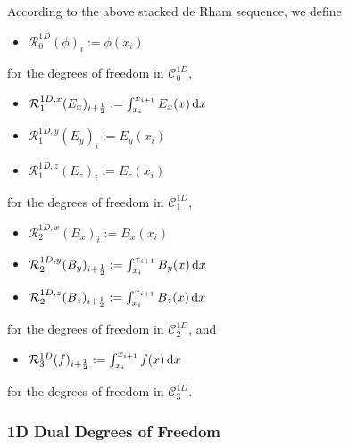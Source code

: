 \documentclass[11pt]{article}
\begin{document}
According to the above stacked de Rham sequence, we define
\begin{itemize}
    \item $\mathcal{R}^{1D}_0(\phi)_{i} := \phi(x_i)$
\end{itemize}
for the degrees of freedom in $\mathcal{C}_0^{1D}$,
\begin{itemize}
    \item $\mathcal{R}^{1D,x}_1(E_x)_{{i+\frac12}} := \int_{x_i}^{x_{i+1}} E_x(x)\, {\rm d} x $
    \item $\mathcal{R}^{1D,y}_1(E_y)_{i} := E_y(x_i) $
    \item $\mathcal{R}^{1D,z}_1(E_z)_{i} := E_z(x_i)$
\end{itemize}
for the degrees of freedom in $\mathcal{C}_1^{1D}$,
\begin{itemize}
    \item $\mathcal{R}^{1D,x}_2(B_x)_{i} := B_x(x_i)$
    \item $\mathcal{R}^{1D,y}_2(B_y)_{{i+\frac12}} := \int_{x_i}^{x_{i+1}} B_y(x)\, {\rm d} x $
    \item $\mathcal{R}^{1D,z}_2(B_z)_{{i+\frac12}} := \int_{x_i}^{x_{i+1}} B_z(x)\, {\rm d} x $
\end{itemize}
for the degrees of freedom in $\mathcal{C}_2^{1D}$,
and 
\begin{itemize}
    \item $\mathcal{R}^{1D}_3(f)_{{i+\frac12}} := \int_{x_i}^{x_{i+1}} f(x)\, {\rm d} x $
\end{itemize}
for the degrees of freedom in $\mathcal{C}_3^{1D}$.

\subsubsection{1D Dual Degrees of Freedom}
\end{document}
